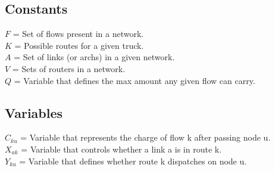 \subsection{Constants}
$F$ = Set of flows present in a network. \\
$K$ = Possible routes for a given truck. \\
$A$ = Set of links (or archs) in a given network. \\
$V$ = Sets of routers in a network. \\
$Q$ = Variable that defines the max amount any given flow can carry.

\subsection{Variables}
$C_{ku}$ =  Variable that represents the charge of flow k after passing node u. \\
$X_{ak}$ =  Variable that controls whether a link a is in route k. \\ 
$Y_{ku}$ =  Variable that defines whether route k dispatches on node u. \\

